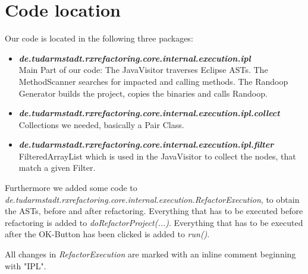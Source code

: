 \documentclass[accentcolor=tud9c, colorback]{tudreport}
\begin{document}
	\chapter{Code location}
		Our code is located in the following three packages:
		\begin{itemize}
			\item \textit{\textbf{de.tudarmstadt.rxrefactoring.core.internal.execution.ipl}}\\
				Main Part of our code: The JavaVisitor traverses Eclipse ASTs. The MethodScanner searches for impacted and calling methods. The Randoop Generator builds the project, copies the binaries and calls Randoop.
			\item \textit{\textbf{de.tudarmstadt.rxrefactoring.core.internal.execution.ipl.collect}}\\
				Collections we needed, basically a Pair Class.
			\item \textit{\textbf{de.tudarmstadt.rxrefactoring.core.internal.execution.ipl.filter}}\\
				FilteredArrayList which is used in the JavaVisitor to collect the nodes, that match a given Filter.
		\end{itemize}
		Furthermore we added some code to \textit{de.tudarmstadt.rxrefactoring.core.internal.execution.RefactorExecution}, to obtain the ASTs, before and after refactoring. Everything that has to be executed before refactoring is added to \textit{doRefactorProject(...)}. Everything that has to be executed after the OK-Button has been clicked is added to \textit{run()}. 
		
		All changes in \textit{RefactorExecution} are marked with an inline comment beginning with "IPL".
\end{document}
